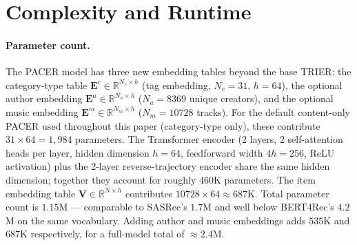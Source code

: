 \section{Complexity and Runtime}
\label{sec:complexity}

\paragraph{Parameter count.}
The PACER model has three new embedding tables beyond the base TRIER: the
category-type table $\mathbf{E}^{c}\in\mathbb{R}^{N_c\times h}$ (tag embedding,
$N_c=31$, $h=64$), the optional author embedding $\mathbf{E}^{a}\in\mathbb{R}^{N_a\times h}$
($N_a=8369$ unique creators), and the optional music embedding
$\mathbf{E}^{m}\in\mathbb{R}^{N_m\times h}$ ($N_m=10728$ tracks). For the
default content-only PACER used throughout this paper (category-type only),
these contribute $31\times64 = 1{,}984$ parameters. The Transformer encoder
(2 layers, 2 self-attention heads per layer, hidden dimension $h=64$,
feedforward width $4h=256$, ReLU activation) plus the 2-layer reverse-trajectory
encoder share the same hidden dimension; together they account for roughly
$460$K parameters. The item embedding table
$\mathbf{V}\in\mathbb{R}^{N\times h}$ contributes $10728\times64 \approx 687$K.
Total parameter count is $1.15$M --- comparable to SASRec's $1.7$M and well
below BERT4Rec's $4.2$M on the same vocabulary. Adding author and music
embeddings adds $535$K and $687$K respectively, for a full-model total of
$\approx 2.4$M.

